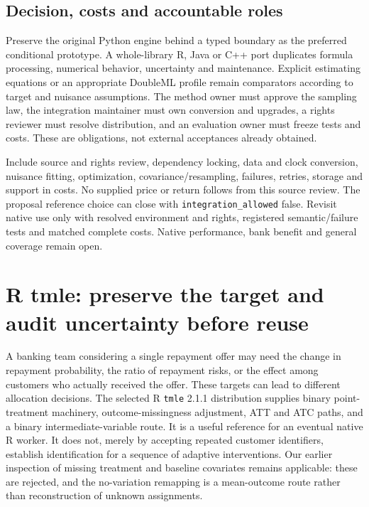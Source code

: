 \subsection{Decision, costs and accountable roles}
Preserve the original Python engine behind a typed boundary as the preferred conditional prototype. A whole-library R, Java or C++ port duplicates formula processing, numerical behavior, uncertainty and maintenance. Explicit estimating equations or an appropriate DoubleML profile remain comparators according to target and nuisance assumptions. The method owner must approve the sampling law, the integration maintainer must own conversion and upgrades, a rights reviewer must resolve distribution, and an evaluation owner must freeze tests and costs. These are obligations, not external acceptances already obtained.~\citep{exec20_python_effect_source,exec24_statsmodels_distribution}

Include source and rights review, dependency locking, data and clock conversion, nuisance fitting, optimization, covariance/resampling, failures, retries, storage and support in costs. No supplied price or return follows from this source review. The proposal reference choice can close with \texttt{integration\_allowed} false. Revisit native use only with resolved environment and rights, registered semantic/failure tests and matched complete costs. Native performance, bank benefit and general coverage remain open.~\citep{exec20_python_effect_source,exec24_statsmodels_distribution}


\section{R tmle: preserve the target and audit uncertainty before reuse}
\label{sec:exec24-tmle-reuse}

A banking team considering a single repayment offer may need the change in
repayment probability, the ratio of repayment risks, or the effect among
customers who actually received the offer. These targets can lead to different
allocation decisions. The selected R \texttt{tmle} 2.1.1 distribution supplies
binary point-treatment machinery, outcome-missingness adjustment, ATT and ATC
paths, and a binary intermediate-variable route. It is a useful reference for
an eventual native R worker. It does not, merely by accepting repeated customer
identifiers, establish identification for a sequence of adaptive interventions.
Our earlier inspection of missing treatment and baseline covariates remains
applicable: these are rejected, and the no-variation remapping is a mean-outcome
route rather than reconstruction of unknown assignments.
\citep{exec20_rfx_tmle}

